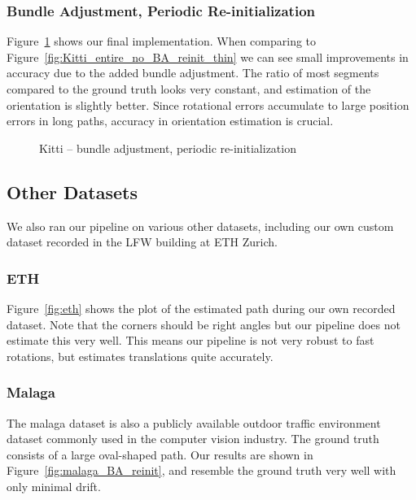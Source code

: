 \documentclass[11pt]{article}
\newlength\figureheight
\newlength\figurewidth
\begin{document}
\subsubsection{Bundle Adjustment, Periodic Re-initialization}
Figure~\ref{fig:Kitti_entire_BA_reinit_thin} shows our final implementation. When comparing to Figure~\ref{fig:Kitti_entire_no_BA_reinit_thin} we can see small improvements in accuracy due to the added bundle adjustment. The ratio of most segments compared to the ground truth looks very constant, and estimation of the orientation is slightly better. Since rotational errors accumulate to large position errors in long paths, accuracy in orientation estimation is crucial.

\begin{figure}[h]
	\centering
	\setlength\figureheight{8cm} 
	\setlength\figurewidth{11cm}
	
	\caption{Kitti -- bundle adjustment, periodic re-initialization}
	\label{fig:Kitti_entire_BA_reinit_thin}
\end{figure}

\subsection{Other Datasets}
We also ran our pipeline on various other datasets, including our own custom dataset recorded in the LFW building at ETH Zurich.

\subsubsection{ETH}
Figure~\ref{fig:eth} shows the plot of the estimated path during our own recorded dataset. Note that the corners should be right angles but our pipeline does not estimate this very well. This means our pipeline is not very robust to fast rotations, but estimates translations quite accurately.

\subsubsection{Malaga}
The malaga dataset is also a publicly available outdoor traffic environment dataset commonly used in the computer vision industry. The ground truth consists of a large oval-shaped path. Our results are shown in Figure~\ref{fig:malaga_BA_reinit}, and resemble the ground truth very well with only minimal drift.
\end{document}
